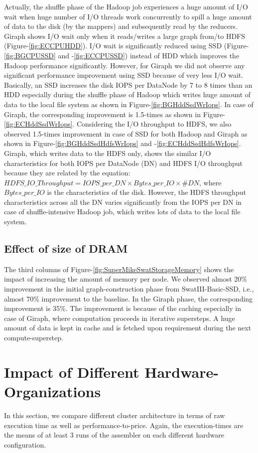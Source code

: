 \documentclass[conference]{IEEEtran}
\begin{document}
Actually, the shuffle phase of the Hadoop job experiences a huge amount of I/O wait when huge number of I/O threads work concurrently to spill a huge amount of data to the disk (by the mappers) and subsequently read by the reducers. Giraph shows I/O wait only when it reads/writes a large graph from/to HDFS (Figure-\ref{fig:ECCPUHDD}). I/O wait is significantly reduced using SSD (Figure-\ref{fig:BGCPUSSD} and -\ref{fig:ECCPUSSD}) instead of HDD which improves the Hadoop performance significantly. However, for Giraph we did not observe any significant performance improvement using SSD because of very less I/O wait. Basically, an SSD increases the disk IOPS per DataNode by 7 to 8 times than an HDD especially during the shuffle phase of Hadoop which writes huge amount of data  to  the local file system as shown in Figure-\ref{fig:BGHddSsdWrIops}. In case of Giraph, the corresponding improvement is 1.5-times as shown in Figure-\ref{fig:ECHddSsdWrIops}. Considering the I/O throughput to HDFS, we also observed 1.5-times improvement in case of SSD for both Hadoop and Giraph as shown in Figure-\ref{fig:BGHddSsdHdfsWrIops} and -\ref{fig:ECHddSsdHdfsWrIops}. Giraph, which writes data to the HDFS only, shows the similar I/O characteristics  for both IOPS per DataNode (DN) and HDFS I/O throughput because they are related by the equation: $HDFS\_IO\_Throughput = IOPS\_per\_DN \times Bytes\_per\_IO \times \#DN$, where $Bytes\_per\_IO$ is the characteristics of the disk.  However, the HDFS throughput characteristics across all the DN varies significantly from the IOPS per DN in case of shuffle-intensive Hadoop job, which writes lots of data to the local file system.

\subsection {Effect of size of DRAM} \label{EffectOfDRAM}
The third columns of Figure-\ref{fig:SuperMikeSwatStorageMemory} shows the impact of increasing the amount of memory per node. 
We observed almost 20\% improvement in the initial graph-construction phase from SwatIII-Basic-SSD, i.e., almost 70\% improvement to the baseline. In the Giraph phase, the corresponding improvement is 35\%. The improvement is because of the caching especially in case of Giraph, where computation proceeds in iterative supersteps. A huge amount of data is kept in cache and is fetched upon requirement during the next compute-superstep.

\section {Impact of Different Hardware-Organizations} \label{ComparingDifferentArchitecturalBalance}
In this section, we compare different cluster architecture in terms of raw execution time as well as performance-to-price. Again, the execution-times are the means of at least 3 runs of the assembler on each different hardware configuration.
\end{document}
